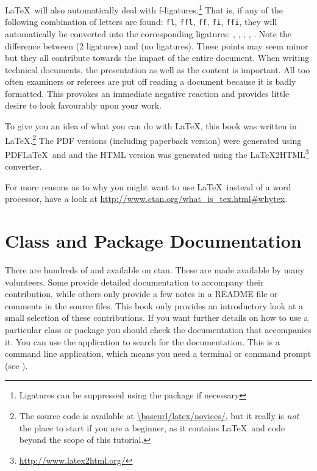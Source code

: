\LaTeX\ will also automatically deal with
f-ligatures.\footnote{Ligatures can be suppressed using the
 package if necessary} That is, if any of the
following combination of letters are found: \texttt{fl},
\texttt{ffl}, \texttt{ff}, \texttt{fi}, \texttt{ffi}, they will
automatically be converted into the corresponding ligatures:
,
,
,
,
.
  Note the difference between
 (2
ligatures) and  (no ligatures).  These
points may seem minor but they all contribute towards the impact of
the entire document.  When writing technical documents, the
presentation as well as the content is important.  All too often
examiners or referees are put off reading a document because it is
badly formatted.  This provokes an immediate negative reaction and
provides little desire to look favourably upon your work.

To give you an idea of what you can do with \LaTeX, this book was
written in \LaTeX.\footnote{The source code is available at
\url{\baseurl/latex/novices/}, but it really is
\emph{not} the place to start if you are a beginner, as it contains
\LaTeX\ and  code beyond the scope of this tutorial.}  The PDF
versions (including  paperback version) were generated using PDF\LaTeX\ and  and
the HTML version was generated using the
\latexhtml
 {\LaTeX2HTML\footnote{\url{http://www.latex2html.org/}}}%
 {}%
 converter. 

For more reasons as to why you might want to use \LaTeX\ instead
of a word processor, have a look at
\ifbookorother
  {\url{http://www.ctan.org/what_is_tex.html\#whytex}.}%
  {}

\section{Class and Package Documentation}
\label{sec:texdoc}

There are hundreds of  and
 available on \gls{ctan}. These are
made available by many volunteers. Some provide detailed
documentation to accompany their contribution, while others only
provide a few notes in a README file or comments in the source
files. This book only provides an introductory
look at a small selection of these contributions. If you want
further details on how to use a particular class or package you
should check the documentation that accompanies it. You can use the
 application to search for the documentation. This
is a command line application, which means you need a terminal or
command prompt (see ).


